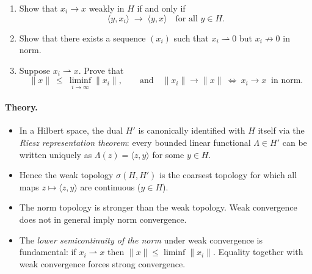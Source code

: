\documentclass[12pt,a4paper]{article}
\theoremstyle{plain}
\theoremstyle{definition}
\theoremstyle{remark}
\theoremstyle{remark}
\theoremstyle{definition}
\begin{document}
	\begin{enumerate}[label=(\roman*)]
		\item Show that $x_i\to x$ weakly in $H$ if and only if
		\[
		\langle y,x_i\rangle \;\longrightarrow\; \langle y,x\rangle
		\quad\text{for all } y\in H .
		\]
		\item Show that there exists a sequence $(x_i)$ such that
		$x_i\rightharpoonup0$ but $x_i\nrightarrow0$ in norm.
		\item Suppose $x_i\rightharpoonup x$.  Prove that
		\[
		\|x\|\ \le\ \liminf_{i\to\infty}\|x_i\|,
		\qquad
		\text{and}\quad
		\|x_i\|\to\|x\|\ \Longleftrightarrow\ x_i\to x\ \text{ in norm.}
		\]
	\end{enumerate}
	
	\paragraph{Theory.}
	\begin{itemize}
		\item In a Hilbert space, the dual $H'$ is canonically identified with $H$ itself
		via the \emph{Riesz representation theorem}:
		every bounded linear functional $\Lambda\in H'$ can be written uniquely as
		$\Lambda(z)=\langle z,y\rangle$ for some $y\in H$.
		\item Hence the weak topology $\sigma(H,H')$ is the coarsest topology for which
		all maps $z\mapsto\langle z,y\rangle$ are continuous ($y\in H$).
		\item The norm topology is stronger than the weak topology.
		Weak convergence does not in general imply norm convergence.
		\item The \emph{lower semicontinuity of the norm} under weak convergence is fundamental:
		if $x_i\rightharpoonup x$ then $\|x\|\le\liminf\|x_i\|$.
		Equality together with weak convergence forces strong convergence.
	\end{itemize}
	
\end{document}
